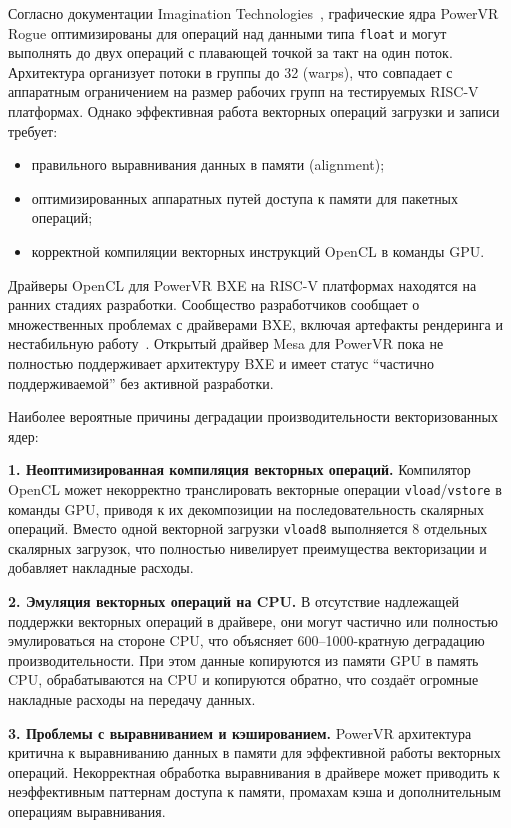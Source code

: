 Согласно документации Imagination Technologies~\cite{img_opencl}, графические ядра PowerVR Rogue оптимизированы для операций над данными типа \texttt{float} и могут выполнять до двух операций с плавающей точкой за такт на один поток. Архитектура организует потоки в группы до 32 (warps), что совпадает с аппаратным ограничением на размер рабочих групп на тестируемых RISC-V платформах. Однако эффективная работа векторных операций загрузки и записи требует:
\begin{itemize}
    \item правильного выравнивания данных в памяти (alignment);
    \item оптимизированных аппаратных путей доступа к памяти для пакетных операций;
    \item корректной компиляции векторных инструкций OpenCL в команды GPU.
\end{itemize}

Драйверы OpenCL для PowerVR BXE на RISC-V платформах находятся на ранних стадиях разработки. Сообщество разработчиков сообщает о множественных проблемах с драйверами BXE, включая артефакты рендеринга и нестабильную работу~\cite{img_opencl}. Открытый драйвер Mesa для PowerVR пока не полностью поддерживает архитектуру BXE и имеет статус ``частично поддерживаемой'' без активной разработки.

Наиболее вероятные причины деградации производительности векторизованных ядер:

\textbf{1. Неоптимизированная компиляция векторных операций.} Компилятор OpenCL может некорректно транслировать векторные операции \texttt{vload}/\texttt{vstore} в команды GPU, приводя к их декомпозиции на последовательность скалярных операций. Вместо одной векторной загрузки \texttt{vload8} выполняется 8 отдельных скалярных загрузок, что полностью нивелирует преимущества векторизации и добавляет накладные расходы.

\textbf{2. Эмуляция векторных операций на CPU.} В отсутствие надлежащей поддержки векторных операций в драйвере, они могут частично или полностью эмулироваться на стороне CPU, что объясняет 600--1000-кратную деградацию производительности. При этом данные копируются из памяти GPU в память CPU, обрабатываются на CPU и копируются обратно, что создаёт огромные накладные расходы на передачу данных.

\textbf{3. Проблемы с выравниванием и кэшированием.} PowerVR архитектура критична к выравниванию данных в памяти для эффективной работы векторных операций. Некорректная обработка выравнивания в драйвере может приводить к неэффективным паттернам доступа к памяти, промахам кэша и дополнительным операциям выравнивания.

